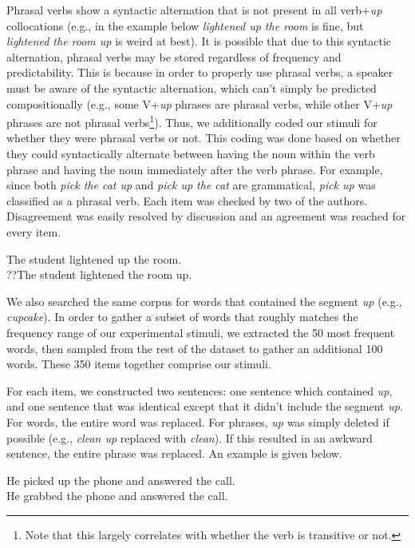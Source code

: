 \documentclass[
  12pt,
  letterpaper,
]{scrreprt}
\begin{document}
Phrasal verbs show a syntactic alternation that is not present in all
verb+\emph{up} collocations (e.g., in the example below \emph{lightened
up the room} is fine, but \emph{lightened the room up} is weird at
best). It is possible that due to this syntactic alternation, phrasal
verbs may be stored regardless of frequency and predictability. This is
because in order to properly use phrasal verbs, a speaker must be aware
of the syntactic alternation, which can't simply be predicted
compositionally (e.g., some V+\emph{up} phrases are phrasal verbs, while
other V+\emph{up} phrases are not phrasal verbs\footnote{Note that this
  largely correlates with whether the verb is transitive or not.}).
Thus, we additionally coded our stimuli for whether they were phrasal
verbs or not. This coding was done based on whether they could
syntactically alternate between having the noun within the verb phrase
and having the noun immediately after the verb phrase. For example,
since both \emph{pick the cat up} and \emph{pick up the cat} are
grammatical, \emph{pick up} was classified as a phrasal verb. Each item
was checked by two of the authors. Disagreement was easily resolved by
discussion and an agreement was reached for every item.

\begin{exe} 
\ex
  \begin{xlist}
    \ex The student lightened up the room. \\
    \ex ??The student lightened the room up. \\
  \end{xlist}
\end{exe}

We also searched the same corpus for words that contained the segment
\emph{up} (e.g., \emph{cupcake}). In order to gather a subset of words
that roughly matches the frequency range of our experimental stimuli, we
extracted the 50 most frequent words, then sampled from the rest of the
dataset to gather an additional 100 words. These 350 items together
comprise our stimuli.

For each item, we constructed two sentences: one sentence which
contained \emph{up}, and one sentence that was identical except that it
didn't include the segment \emph{up.} For words, the entire word was
replaced. For phrases, \emph{up} was simply deleted if possible (e.g.,
\emph{clean up} replaced with \emph{clean}). If this resulted in an
awkward sentence, the entire phrase was replaced. An example is given
below.

\begin{exe} 
\ex
  \begin{xlist}
    \ex He picked up the phone and answered the call. \\
    \ex He grabbed the phone and answered the call. \\
  \end{xlist}
\end{exe}
\end{document}
